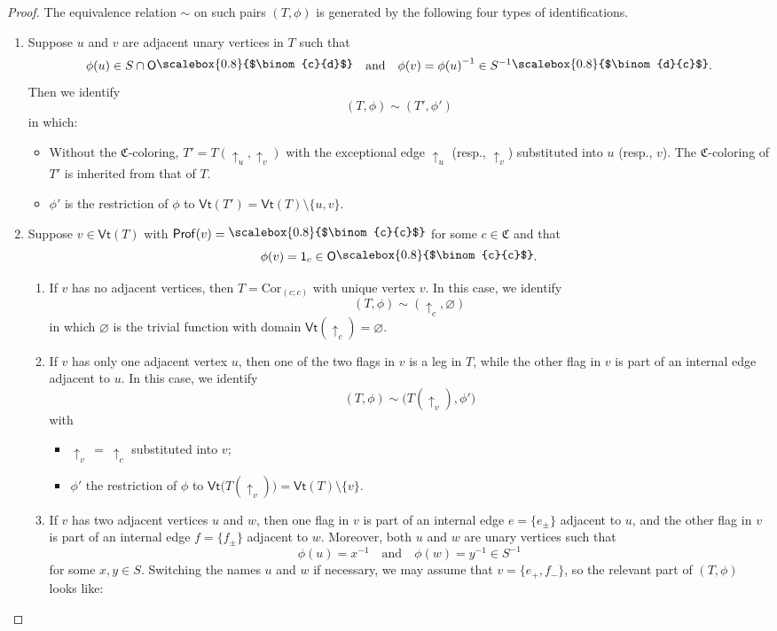 \documentclass{amsbook}
\numberwithin{section}{chapter}
\numberwithin{subsection}{section}
\numberwithin{equation}{section}
\theoremstyle{plain}
\theoremstyle{definition}
\newcommand{\colorc}{\mathfrak{C}}
\newcommand{\Cor}{\mathrm{Cor}}
\newcommand{\Prof}{\mathsf{Prof}}
\newcommand{\profofv}{\Prof(v)}
\newcommand{\Vt}{\mathsf{Vt}}
\renewcommand{\O}{\mathsf{O}}
\newcommand{\operadunit}{\mathsf{1}}
\newcommand{\inv}[1]{{#1}^{-1}}
\newcommand{\Sinv}{\inv{S}}
\newcommand{\xinv}{\inv{x}}
\newcommand{\yinv}{\inv{y}}
\newcommand{\smallprof}[1]
{\raisebox{.05cm}{\scalebox{0.8}{#1}}}
\newcommand{\cc}{\smallprof{$\binom{c}{c}$}}
\newcommand{\cd}{\smallprof{$\binom{c}{d}$}}
\newcommand{\dc}{\smallprof{$\binom{d}{c}$}}
\newcommand{\andspace}{\quad\text{and}\quad}
\begin{document}
\begin{proof}
The equivalence relation $\sim$ on such pairs $(T,\phi)$ is generated by the following four types of identifications.
\begin{enumerate}
\item Suppose $u$ and $v$ are adjacent unary vertices in $T$ such that \[\phi(u) \in S\cap\O\cd \andspace \phi(v) = \inv{\phi(u)} \in \Sinv\dc.\]  Then we identify \[(T,\phi) \sim (T',\phi')\] in which:
\begin{itemize}\item Without the $\colorc$-coloring, $T'=T(\uparrow_u,\uparrow_v)$ with the exceptional edge $\uparrow_u$ (resp., $\uparrow_v$) substituted into $u$ (resp., $v$).  The $\colorc$-coloring of $T'$ is inherited from that of $T$.
\item $\phi'$ is the restriction of $\phi$ to $\Vt(T') = \Vt(T) \setminus \{u,v\}$.
\end{itemize}
\item Suppose $v \in \Vt(T)$ with $\profofv =\cc$ for some $c\in\colorc$ and that \[\phi(v)=\operadunit_c\in \O\cc.\]
\begin{enumerate}
\item If $v$ has no adjacent vertices, then $T=\Cor_{(c;c)}$ with unique vertex $v$.  In this case, we identify \[(T,\phi) \sim (\uparrow_c,\varnothing)\] in which $\varnothing$ is the trivial function with domain $\Vt(\uparrow_c)=\varnothing$.
\item If $v$ has only one adjacent vertex $u$, then one of the two flags in $v$ is a leg in $T$, while the other flag in $v$ is part of an internal edge adjacent to $u$.  In this case, we identify \[(T,\phi) \sim \bigl(T(\uparrow_v),\phi'\bigr)\] with 
\begin{itemize}\item $\uparrow_v\,=~\uparrow_c$ substituted into $v$;
\item $\phi'$ the restriction of $\phi$ to $\Vt\bigl(T(\uparrow_v)\bigr) = \Vt(T) \setminus\{v\}$.
\end{itemize}
\item If $v$ has two adjacent vertices $u$ and $w$, then one flag in $v$ is part of an internal edge $e=\{e_{\pm}\}$ adjacent to $u$, and the other flag in $v$ is part of an internal edge $f=\{f_{\pm}\}$ adjacent to $w$.  Moreover, both $u$ and $w$ are unary vertices such that \[\phi(u)=\xinv \andspace \phi(w)=\yinv \in \Sinv\] for some $x,y \in S$.  Switching the names $u$ and $w$ if necessary, we may assume that $v=\{e_+,f_-\}$, so the relevant part of $(T,\phi)$ looks like:
\begin{center}\begin{tikzpicture}

\end{tikzpicture}
\end{center}
\end{enumerate}
\end{enumerate}
\end{proof}
\end{document}
